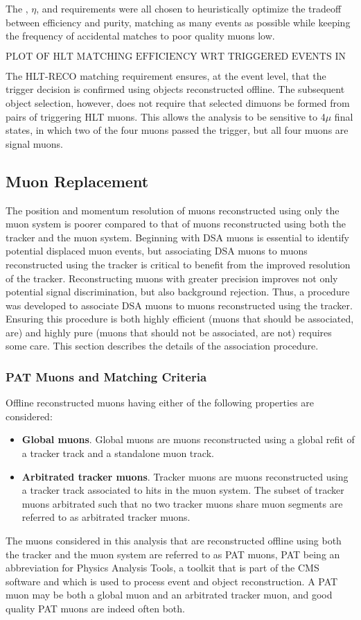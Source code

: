 The \pT, $\eta$, and \deltaR requirements were all chosen to heuristically optimize the tradeoff between efficiency and purity, matching as many events as possible while keeping the frequency of accidental matches to poor quality muons low.

$$\text{PLOT OF HLT MATCHING EFFICIENCY WRT TRIGGERED EVENTS IN SIGNAL}$$

The HLT-RECO matching requirement ensures, at the event level, that the trigger decision is confirmed using objects reconstructed offline.
The subsequent object selection, however, does not require that selected dimuons be formed from pairs of triggering HLT muons.
This allows the analysis to be sensitive to 4$\mu$ final states, in which two of the four muons passed the trigger, but all four muons are signal muons.

\subsection{\DSAToPAT Muon Replacement}
The position and momentum resolution of muons reconstructed using only the muon system is poorer compared to that of muons reconstructed using both the tracker and the muon system.
Beginning with DSA muons is essential to identify potential displaced muon events, but associating DSA muons to muons reconstructed using the tracker is critical to benefit from the improved resolution of the tracker.
Reconstructing muons with greater precision improves not only potential signal discrimination, but also background rejection.
Thus, a procedure was developed to associate DSA muons to muons reconstructed using the tracker.
Ensuring this procedure is both highly efficient (\ie muons that should be associated, are) and highly pure (\ie muons that should not be associated, are not) requires some care.
This section describes the details of the association procedure.

\subsubsection{PAT Muons and Matching Criteria}
Offline reconstructed muons having either of the following properties are considered:
\begin{itemize}
  \item \textbf{Global muons}. Global muons are muons reconstructed using a global refit of a tracker track and a standalone muon track.
  \item \textbf{Arbitrated tracker muons}. Tracker muons are muons reconstructed using a tracker track associated to hits in the muon system. The subset of tracker muons arbitrated such that no two tracker muons share muon segments are referred to as arbitrated tracker muons.
\end{itemize}
The muons considered in this analysis that are reconstructed offline using both the tracker and the muon system are referred to as PAT muons, PAT being an abbreviation for Physics Analysis Tools, a toolkit that is part of the CMS software and which is used to process event and object reconstruction.
A PAT muon may be both a global muon and an arbitrated tracker muon, and good quality PAT muons are indeed often both.

